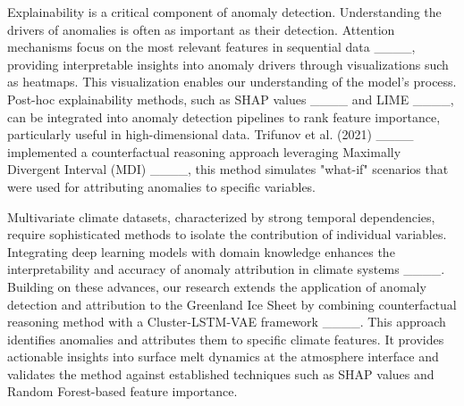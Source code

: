 Explainability is a critical component of anomaly detection. Understanding the drivers of anomalies is often as important as their detection. Attention mechanisms focus on the most relevant features in sequential data ____, providing interpretable insights into anomaly drivers through visualizations such as heatmaps. This visualization enables our understanding of the model's process. Post-hoc explainability methods, such as SHAP values ____ and LIME ____, can be integrated into anomaly detection pipelines to rank feature importance, particularly useful in high-dimensional data. Trifunov et al. (2021) ____ implemented a counterfactual reasoning approach leveraging Maximally Divergent Interval (MDI) ____, this method simulates "what-if" scenarios that were used for attributing anomalies to specific variables.

Multivariate climate datasets, characterized by strong temporal dependencies, require sophisticated methods to isolate the contribution of individual variables. Integrating deep learning models with domain knowledge enhances the interpretability and accuracy of anomaly attribution in climate systems ____. Building on these advances, our research extends the application of anomaly detection and attribution to the Greenland Ice Sheet by combining counterfactual reasoning method with a Cluster-LSTM-VAE framework ____. This approach identifies anomalies and attributes them to specific climate features. It provides actionable insights into surface melt dynamics at the atmosphere interface and validates the method against established techniques such as SHAP values and Random Forest-based feature importance.